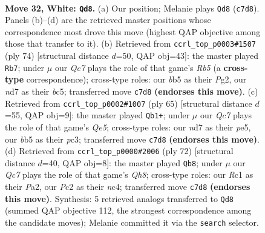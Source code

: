\documentclass[11pt]{article}
\begin{document}
\clearpage

\begin{figure}[p]\centering
\begin{subfigure}{0.46\textwidth}\centering
\resizebox{\linewidth}{!}{%
\newchessgame
\chessboard[
  setfen={8/2Qn1k2/r7/pb1Pp3/8/6p1/PPP3P1/2R1K3 w - - 0 32},
  showmover=false,
  pgfstyle=straightmove, color=movearrow, markmove={c7-d8}
]}
\caption{}
\end{subfigure}\hfill
\begin{subfigure}{0.46\textwidth}\centering
\resizebox{\linewidth}{!}{%
\newchessgame
\chessboard[
  setfen={7k/n6p/8/PRbr4/6P1/2P1p3/6P1/4R2K w - - 3 38},
  showmover=false,
  pgfstyle=straightmove, color=movearrow, markmove={b5-b7}
]}
\caption{}
\end{subfigure}
\\[4pt]
\begin{subfigure}{0.46\textwidth}\centering
\resizebox{\linewidth}{!}{%
\newchessgame
\chessboard[
  setfen={r6k/pppn1p2/8/4P1Rp/4q3/2P5/P2B3Q/3K4 b - - 14 33},
  showmover=false,
  pgfstyle=straightmove, color=movearrow, markmove={e4-b1}
]}
\caption{}
\end{subfigure}\hfill
\begin{subfigure}{0.46\textwidth}\centering
\resizebox{\linewidth}{!}{%
\newchessgame
\chessboard[
  setfen={7Q/p3krp1/1p6/3b4/2nP3P/2P5/P5P1/6K1 w - - 1 37},
  showmover=false,
  pgfstyle=straightmove, color=movearrow, markmove={h8-b8}
]}
\caption{}
\end{subfigure}
\caption{\textbf{Move 32, White: \texttt{Qd8}.} (a) Our position; Melanie plays \texttt{Qd8} (\texttt{c7d8}). Panels (b)--(d) are the retrieved master positions whose correspondence most drove this move (highest QAP objective among those that transfer to it). (b) Retrieved from \texttt{ccrl\_top\_p0003\#1507} (ply 74) [structural distance $d$=50, QAP obj=43]: the master played \texttt{Rb7}; under $\mu$ our \emph{Qc7} plays the role of that game's \emph{Rb5} (a \textbf{cross-type} correspondence); cross-type roles: our \emph{b}b5 as their \emph{P}g2, our \emph{n}d7 as their \emph{b}c5; transferred move \texttt{c7d8} \textbf{(endorses this move)}. (c) Retrieved from \texttt{ccrl\_top\_p0002\#1007} (ply 65) [structural distance $d$=55, QAP obj=9]: the master played \texttt{Qb1+}; under $\mu$ our \emph{Qc7} plays the role of that game's \emph{Qe5}; cross-type roles: our \emph{n}d7 as their \emph{p}e5, our \emph{b}b5 as their \emph{p}c3; transferred move \texttt{c7d8} \textbf{(endorses this move)}. (d) Retrieved from \texttt{ccrl\_top\_p0000\#2006} (ply 72) [structural distance $d$=40, QAP obj=8]: the master played \texttt{Qb8}; under $\mu$ our \emph{Qc7} plays the role of that game's \emph{Qh8}; cross-type roles: our \emph{R}c1 as their \emph{P}a2, our \emph{P}c2 as their \emph{n}c4; transferred move \texttt{c7d8} \textbf{(endorses this move)}. Synthesis: 5 retrieved analogs transferred to \texttt{Qd8} (summed QAP objective 112, the strongest correspondence among the candidate moves); Melanie committed it via the \texttt{search} selector.}
\label{fig:thought-m62}
\end{figure}
\end{document}
